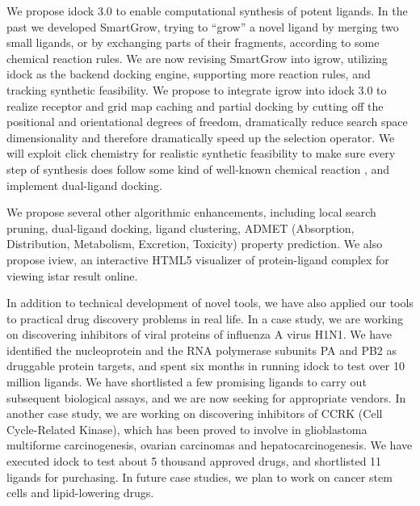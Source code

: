 We propose idock 3.0 to enable computational synthesis of potent ligands. In the past we developed SmartGrow, trying to ``grow'' a novel ligand by merging two small ligands, or by exchanging parts of their fragments, according to some chemical reaction rules. We are now revising SmartGrow into igrow, utilizing idock as the backend docking engine, supporting more reaction rules, and tracking synthetic feasibility. We propose to integrate igrow into idock 3.0 to realize receptor and grid map caching and partial docking by cutting off the positional and orientational degrees of freedom, dramatically reduce search space dimensionality and therefore dramatically speed up the selection operator. We will exploit click chemistry for realistic synthetic feasibility to make sure every step of synthesis does follow some kind of well-known chemical reaction \citep{1051}, and implement dual-ligand docking.

We propose several other algorithmic enhancements, including local search pruning, dual-ligand docking, ligand clustering, ADMET (Absorption, Distribution, Metabolism, Excretion, Toxicity) property prediction. We also propose iview, an interactive HTML5 visualizer of protein-ligand complex for viewing istar result online.

In addition to technical development of novel tools, we have also applied our tools to practical drug discovery problems in real life. In a case study, we are working on discovering inhibitors of viral proteins of influenza A virus H1N1. We have identified the nucleoprotein and the RNA polymerase subunits PA and PB2 as druggable protein targets, and spent six months in running idock to test over 10 million ligands. We have shortlisted a few promising ligands to carry out subsequent biological assays, and we are now seeking for appropriate vendors. In another case study, we are working on discovering inhibitors of CCRK (Cell Cycle-Related Kinase), which has been proved to involve in glioblastoma multiforme carcinogenesis, ovarian carcinomas and hepatocarcinogenesis. We have executed idock to test about 5 thousand approved drugs, and shortlisted 11 ligands for purchasing. In future case studies, we plan to work on cancer stem cells and lipid-lowering drugs.

\chapterend

